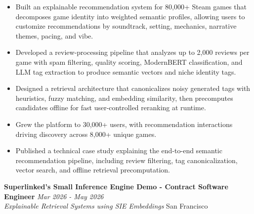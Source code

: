 \documentclass[a4paper,11pt]{article}
\newcommand{\resumeSubheading}[4]{%
\vspace{1mm}
\textbf{#1} \hfill \textit{\footnotesize #4} \\
\textit{\footnotesize #3} \hfill \footnotesize #2
\vspace{1mm}
}
\begin{document}
\begin{itemize}[leftmargin=0.35in, itemsep=0.5mm]

\item Built an explainable recommendation system for 80,000+ Steam games that decomposes game identity into weighted semantic profiles, allowing users to customize recommendations by soundtrack, setting, mechanics, narrative themes, pacing, and vibe.

\vspace{-.7mm}

\item Developed a review-processing pipeline that analyzes up to 2,000 reviews per game with spam filtering, quality scoring, ModernBERT classification, and LLM tag extraction to produce semantic vectors and niche identity tags.

\vspace{-.7mm}

\item Designed a retrieval architecture that canonicalizes noisy generated tags with heuristics, fuzzy matching, and embedding similarity, then precomputes candidates offline for fast user-controlled reranking at runtime.

\vspace{-.7mm}

\item Grew the platform to 30,000+ users, with recommendation interactions driving discovery across 8,000+ unique games.

\vspace{-.7mm}

\item Published a technical case study explaining the end-to-end semantic recommendation pipeline, including review filtering, tag canonicalization, vector search, and offline retrieval precomputation.

\vspace{-.7mm}

\end{itemize}

\vspace{-3mm}
\resumeSubheading
{Superlinked's Small Inference Engine Demo - Contract Software Engineer}{San Francisco}
{Explainable Retrieval Systems using SIE Embeddings}{Mar 2026 - May 2026}
\vspace{-4mm}
\end{document}

